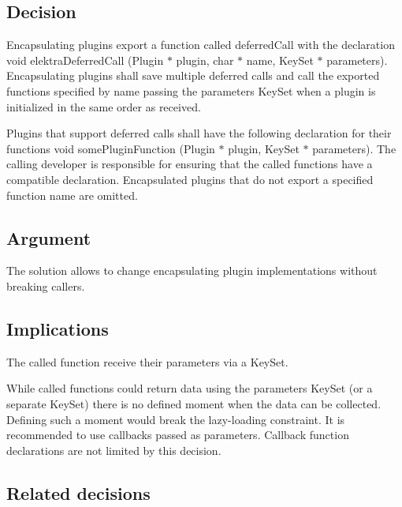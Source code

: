 \subsection*{Decision}

Encapsulating plugins export a function called {\ttfamily deferred\+Call} with the declaration {\ttfamily void elektra\+Deferred\+Call (Plugin $\ast$ plugin, char $\ast$ name, Key\+Set $\ast$ parameters)}. Encapsulating plugins shall save multiple deferred calls and call the exported functions specified by {\ttfamily name} passing the {\ttfamily parameters} Key\+Set when a plugin is initialized in the same order as received.

Plugins that support deferred calls shall have the following declaration for their functions {\ttfamily void some\+Plugin\+Function (Plugin $\ast$ plugin, Key\+Set $\ast$ parameters)}. The calling developer is responsible for ensuring that the called functions have a compatible declaration. Encapsulated plugins that do not export a specified function name are omitted.

\subsection*{Argument}

The solution allows to change encapsulating plugin implementations without breaking callers.

\subsection*{Implications}

The called function receive their parameters via a Key\+Set.

While called functions could return data using the {\ttfamily parameters} Key\+Set (or a separate Key\+Set) there is no defined moment when the data can be collected. Defining such a moment would break the lazy-\/loading constraint. It is recommended to use callbacks passed as {\ttfamily parameters}. Callback function declarations are not limited by this decision.

\subsection*{Related decisions}


